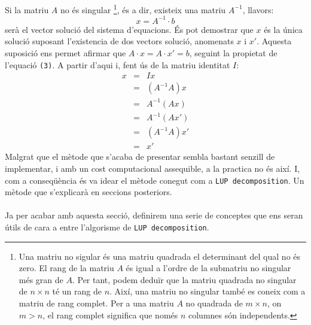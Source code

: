 \documentclass{article}
\begin{document}
    Si la matriu $A$ no és singular \footnote{Una matriu no sigular és una matriu quadrada el determinant del qual no és zero. El rang de la matriu $A$ és igual a l'ordre de la submatriu no singular més gran de $A$. Per tant, podem deduïr que la matriu quadrada no singular de $n\times n$ té un rang de $n$. Així, una matriu no singular també es coneix com a matriu de rang complet. Per a una matriu $A$ no quadrada de $m \times n$, on $ m > n$, el rang complet significa que només $n$ columnes són independents.}, és a dir, existeix una matriu $A^{-1}$, llavors:
    \begin{equation}
        x = A^{-1} \cdot b
    \end{equation}
    serà el vector solució del sistema d'equacions. És pot demostrar que $x$ és la única solució suposant l'existencia de dos vectors solució, anomenats $x$ i $x'$. Aquesta suposició ens permet afirmar que $A \cdot x = A \cdot x' = b$, seguint la propietat de l'equació \texttt{(3)}. A partir d'aqui i, fent ús de la matriu identitat $I$:
    \begin{equation}
        \begin{matrix}
            x & = & Ix \\
            & = & ( A^{-1} A ) x \\
            & = & A^{-1} ( A x ) \\
            & = & A^{-1} ( A x' ) \\
            & = & ( A^{-1} A ) x' \\
            & = & x'
        \end{matrix}
    \end{equation}
    Malgrat que el mètode que s'acaba de presentar sembla bastant senzill de implementar, i amb un cost computacional assequible, a la practica no és així. I, com a conseqüència és va idear el mètode conegut com a \texttt{LUP decomposition}. Un mètode que s'explicarà en seccions posteriors. \\ \\
    Ja per acabar amb aquesta secció, definirem una serie de conceptes que ens seran útils de cara a entre l'algorisme de \texttt{LUP decomposition}.
\end{document}
